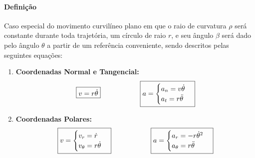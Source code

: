 \documentclass{article}
\begin{document}
            \paragraph{Definição}Caso especial do movimento curvilíneo plano em que o raio de curvatura $\rho$ será constante durante toda trajetória, um círculo de raio $r$, e seu ângulo $\beta$ será dado pelo ângulo $\theta$ a partir de um referência conveniente, sendo descritos pelas seguintes equações:
                \begin{enumerate}
                    \item \textbf{Coordenadas Normal e Tangencial:}
                        \begin{equation}
                            \boxed{
                                v = r \dot{\theta}
                            }
                            \hspace{20mm}
                            \boxed{
                                a = 
                                \begin{cases}
                                    a_{n} = v \dot{\theta}\\
                                    a_{t} = r \ddot{\theta}\\
                                \end{cases}
                            }
                        \end{equation}
                    \item \textbf{Coordenadas Polares:}
                        \begin{equation}
                            \boxed{
                                v = 
                                \begin{cases}
                                    v_{r} = \dot{r}\\
                                    v_{\theta} = r \dot{\theta}\\
                                \end{cases}
                            }
                            \hspace{20mm}
                            \boxed{
                                a = 
                                \begin{cases}
                                    a_{r} = - r\dot{\theta}^{2}\\
                                    a_{\theta} = r \ddot{\theta}\\
                                \end{cases}
                            }
                        \end{equation}
                \end{enumerate}
\end{document}
